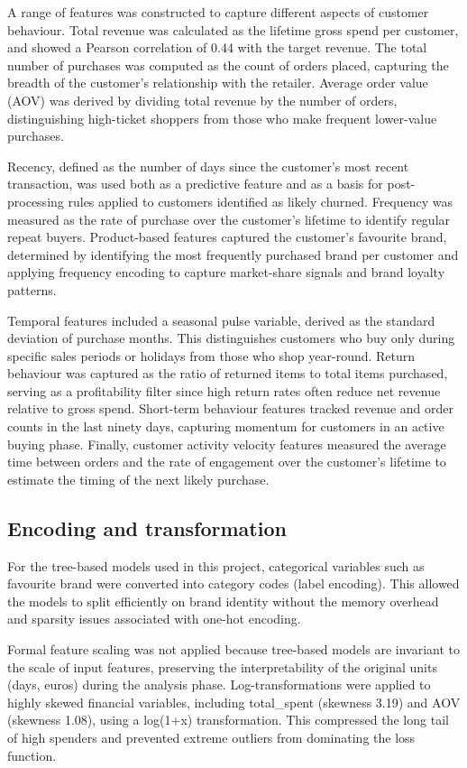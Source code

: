 A range of features was constructed to capture different aspects of customer behaviour. Total revenue was calculated as the lifetime gross spend per customer, and showed a Pearson correlation of 0.44 with the target revenue. The total number of purchases was computed as the count of orders placed, capturing the breadth of the customer's relationship with the retailer. Average order value (AOV) was derived by dividing total revenue by the number of orders, distinguishing high-ticket shoppers from those who make frequent lower-value purchases.

Recency, defined as the number of days since the customer's most recent transaction, was used both as a predictive feature and as a basis for post-processing rules applied to customers identified as likely churned. Frequency was measured as the rate of purchase over the customer's lifetime to identify regular repeat buyers. Product-based features captured the customer's favourite brand, determined by identifying the most frequently purchased brand per customer and applying frequency encoding to capture market-share signals and brand loyalty patterns.

Temporal features included a seasonal pulse variable, derived as the standard deviation of purchase months. This distinguishes customers who buy only during specific sales periods or holidays from those who shop year-round. Return behaviour was captured as the ratio of returned items to total items purchased, serving as a profitability filter since high return rates often reduce net revenue relative to gross spend. Short-term behaviour features tracked revenue and order counts in the last ninety days, capturing momentum for customers in an active buying phase. Finally, customer activity velocity features measured the average time between orders and the rate of engagement over the customer's lifetime to estimate the timing of the next likely purchase.

\subsection{Encoding and transformation}
For the tree-based models used in this project, categorical variables such as favourite brand were converted into category codes (label encoding). This allowed the models to split efficiently on brand identity without the memory overhead and sparsity issues associated with one-hot encoding.

Formal feature scaling was not applied because tree-based models are invariant to the scale of input features, preserving the interpretability of the original units (days, euros) during the analysis phase. Log-transformations were applied to highly skewed financial variables, including total\_spent (skewness 3.19) and AOV (skewness 1.08), using a log(1+x) transformation. This compressed the long tail of high spenders and prevented extreme outliers from dominating the loss function.

